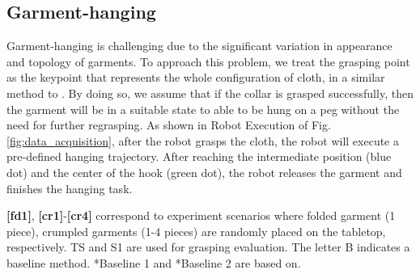 \documentclass[letterpaper, 10 pt, conference]{ieeeconf}  %
\begin{document}
\subsection{Garment-hanging}
Garment-hanging is challenging due to the significant variation in appearance and topology of garments. To approach this problem, we treat the grasping point as the keypoint that represents the whole configuration of cloth, in a similar method to \cite{manuelli2019kpam}. By doing so, we assume that if the collar is grasped successfully, then the garment will be in a suitable state to able to be hung on a peg without the need for further regrasping. As shown in Robot Execution of Fig. \ref{fig:data_acquisition}, after the robot grasps the cloth, the robot will execute a pre-defined hanging trajectory. After reaching the intermediate position (blue dot) and the center of the hook (green dot), the robot releases the garment and finishes the hanging task.

\begin{table}[t]
\centering

\caption{Grasping Success Rate with Robot and A Parallel Gripper.}
\vspace{-2mm}
\par
\begin{flushleft}
\textbf{[fd1]}, \textbf{[cr1]}-\textbf{[cr4]} correspond to experiment scenarios where folded garment (1 piece), crumpled garments (1-4 pieces) are randomly placed on the tabletop, respectively. TS and S1 are used for grasping evaluation. The letter B indicates a baseline method. *Baseline 1 and *Baseline 2 are based on\cite{ramisa2012using,zhang2020learning}.
\end{flushleft}
\label{table:grasping}
\vspace{-10pt}
\end{table}
\end{document}
